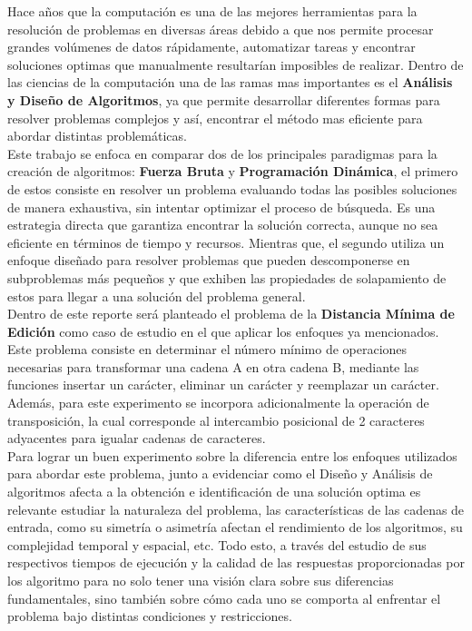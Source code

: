Hace años que la computación es una de las mejores herramientas para la resolución de problemas en diversas áreas debido a que nos permite procesar grandes volúmenes de datos rápidamente, automatizar tareas y encontrar soluciones optimas que manualmente resultarían imposibles de realizar. Dentro de las ciencias de la computación una de las ramas mas importantes es el \textbf{Análisis y Diseño de Algoritmos}, ya que permite desarrollar diferentes formas para resolver problemas complejos y así, encontrar el método mas eficiente para abordar distintas problemáticas.\\

Este trabajo se enfoca en comparar dos de los principales paradigmas para la creación de algoritmos: \textbf{Fuerza Bruta} y \textbf{Programación Dinámica}, el primero de estos consiste en resolver un problema evaluando todas las posibles soluciones de manera exhaustiva, sin intentar optimizar el proceso de búsqueda. Es una estrategia directa que garantiza encontrar la solución correcta, aunque no sea eficiente en términos de tiempo y recursos. Mientras que, el segundo utiliza un enfoque diseñado para resolver problemas que pueden descomponerse en subproblemas más pequeños y que exhiben las propiedades de solapamiento de estos para llegar a una solución del problema general.\\

Dentro de este reporte será planteado el problema de la \textbf{Distancia Mínima de Edición} como caso de estudio en el que aplicar los enfoques ya mencionados. Este problema consiste en determinar el número mínimo de operaciones necesarias para transformar una cadena A en otra cadena B, mediante las funciones insertar un carácter, eliminar un carácter y reemplazar un carácter. Además, para este experimento se incorpora adicionalmente la operación de transposición, la cual corresponde al intercambio posicional de 2 caracteres adyacentes para igualar cadenas de caracteres.\\

Para lograr un buen experimento sobre la diferencia entre los enfoques utilizados para abordar este problema, junto a evidenciar como el Diseño y Análisis de algoritmos afecta a la obtención e identificación de una solución optima es relevante estudiar la naturaleza del problema, las características de las cadenas de entrada, como su simetría o asimetría afectan el rendimiento de los algoritmos, su complejidad temporal y espacial, etc. Todo esto, a través del estudio de sus respectivos tiempos de ejecución y la calidad de las respuestas proporcionadas por los algoritmo para no solo tener una visión clara sobre sus diferencias fundamentales, sino también sobre cómo cada uno se comporta al enfrentar el problema bajo distintas condiciones y restricciones.\\